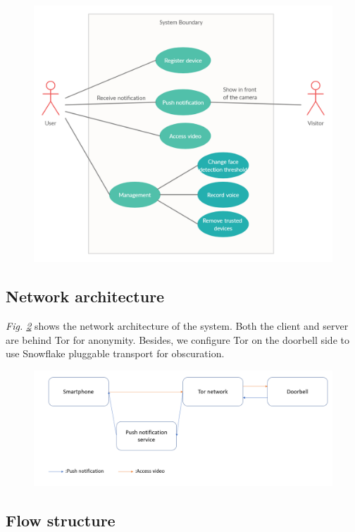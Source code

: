 \begin{figure}
	\includegraphics[width=\linewidth]{Use_case_diagram.png}
	\caption{}
	\label{fig:usecase}
\end{figure}

\subsection{Network architecture}
\textit{Fig. \ref{fig:architecture}} shows the network architecture of the system. Both the client and server are behind Tor for anonymity. Besides, we configure Tor on the doorbell side to use Snowflake \cite{snowflake} pluggable transport for obscuration.

\begin{figure}
	\includegraphics[width=\linewidth]{architecture.png}
	\caption{}
	\label{fig:architecture}
\end{figure}

\subsection{Flow structure}

